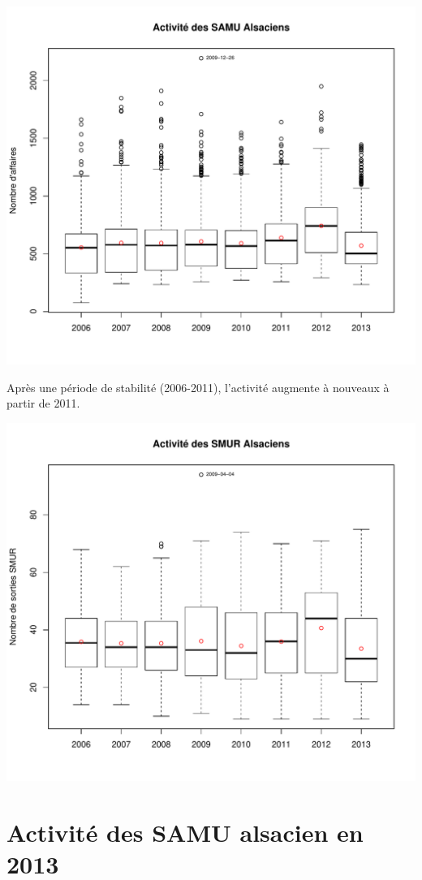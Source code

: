 \documentclass[12pt,english,french,twoside]{report}\usepackage[]{graphicx}\usepackage[]{color}
\makeatletter
\def\maxwidth{ %
  \ifdim\Gin@nat@width>\linewidth
    \linewidth
  \else
    \Gin@nat@width
  \fi
}
\makeatother
\begin{document}
\includegraphics[width=\maxwidth]{figure/samu_global} 



Après une période de stabilité (2006-2011), l'activité augmente à nouveaux à partir de 2011.


\includegraphics[width=\maxwidth]{figure/smur} 



\section*{Activité des SAMU alsacien en 2013}
\end{document}
